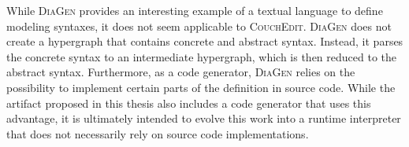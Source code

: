 While \textsc{DiaGen} provides an interesting example of a textual language to define modeling syntaxes, it does not seem applicable to \textsc{CouchEdit}. \textsc{DiaGen} does not create a hypergraph that contains concrete and abstract syntax. Instead, it parses the concrete syntax to an intermediate hypergraph, which is then reduced to the abstract syntax. Furthermore, as a code generator, \textsc{DiaGen} relies on the possibility to implement certain parts of the definition in source code. While the artifact proposed in this thesis also includes a code generator that uses this advantage, it is ultimately intended to evolve this work into a runtime interpreter that does not necessarily rely on source code implementations.